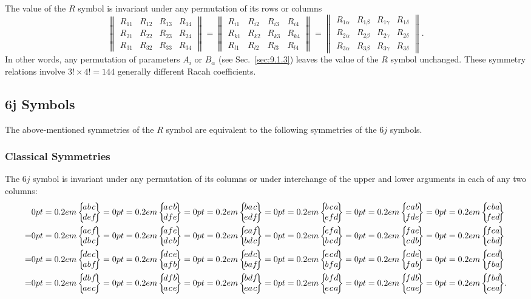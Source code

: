The value of the $R$ symbol is invariant under any permutation of its rows or columns \cite{ref105}
\begin{equation}
\left\|\begin{array}{llll}
R_{11} & R_{12} & R_{13} & R_{14}  \label{eq:9:4:1}\\
R_{21} & R_{22} & R_{23} & R_{24} \\
R_{31} & R_{32} & R_{33} & R_{34}
\end{array}\right\|=\left\|\begin{array}{llll}
R_{i 1} & R_{i 2} & R_{i 3} & R_{i 4} \\
R_{k 1} & R_{k 2} & R_{k 3} & R_{k 4} \\
R_{l 1} & R_{l 2} & R_{l 3} & R_{l 4}
\end{array}\right\|=\left\|\begin{array}{llll}
R_{1 \alpha} & R_{1 \beta} & R_{1 \gamma} & R_{1 \delta} \\
R_{2 \alpha} & R_{2 \beta} & R_{2 \gamma} & R_{2 \delta} \\
R_{3 \alpha} & R_{3 \beta} & R_{3 \gamma} & R_{3 \delta}
\end{array}\right\| .
\end{equation}
In other words, any permutation of parameters $A_{i}$ or $B_{\alpha}$ (see Sec.~\ref{sec:9.1.3}) leaves the value of the $R$ symbol unchanged. These symmetry relations involve $3!\times 4!=144$ generally different Racah coefficients.

\subsection{6j Symbols}\label{sec:9.4.2}
The above-mentioned symmetries of the $R$ symbol are equivalent to the following symmetries of the $6 j$ symbols.\\[0pt]
\subsubsection{Classical Symmetries \cite{ref110}}
The $6 j$ symbol is invariant under any permutation of its columns or under interchange of the upper and lower arguments in each of any two columns:
\begin{equation}
\begin{aligned}
& \sixj{a}{b}{c}{d}{e}{f}=\sixj{a}{c}{b}{d}{f}{e}=\sixj{b}{a}{c}{e}{d}{f}=\sixj{b}{c}{a}{e}{f}{d}=\sixj{c}{a}{b}{f}{d}{e}=\sixj{c}{b}{a}{f}{e}{d}  \\
 =&\sixj{a}{e}{f}{d}{b}{c}=\sixj{a}{f}{e}{d}{c}{b}=\sixj{e}{a}{f}{b}{d}{c}=\sixj{e}{f}{a}{b}{c}{d}=\sixj{f}{a}{e}{c}{d}{b}=\sixj{f}{e}{a}{c}{b}{d}  \\
=&\sixj{d}{e}{c}{a}{b}{f}=\sixj{d}{c}{e}{a}{f}{b}=\sixj{e}{d}{c}{b}{a}{f}=\sixj{e}{c}{d}{b}{f}{a}=\sixj{c}{d}{e}{f}{a}{b}=\sixj{c}{e}{d}{f}{b}{a}  \\
 =&\sixj{d}{b}{f}{a}{e}{c}=\sixj{d}{f}{b}{a}{c}{e}=\sixj{b}{d}{f}{e}{a}{c}=\sixj{b}{f}{d}{e}{c}{a}=\sixj{f}{d}{b}{c}{a}{e}=\sixj{f}{b}{d}{c}{e}{a} . 
\end{aligned}
\label{eq:9:4:2}
\end{equation}

